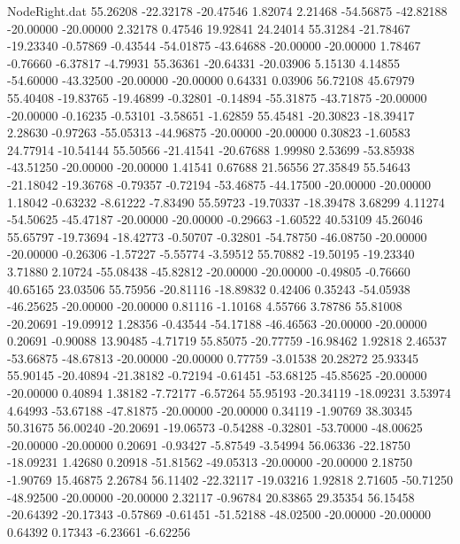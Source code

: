\begin{filecontents}{NodeRight.dat}
  55.26208  -22.32178  -20.47546     1.82074    2.21468  -54.56875  -42.82188  -20.00000  -20.00000    2.32178    0.47546   19.92841   24.24014
  55.31284  -21.78467  -19.23340    -0.57869   -0.43544  -54.01875  -43.64688  -20.00000  -20.00000    1.78467   -0.76660   -6.37817   -4.79931
  55.36361  -20.64331  -20.03906     5.15130    4.14855  -54.60000  -43.32500  -20.00000  -20.00000    0.64331    0.03906   56.72108   45.67979
  55.40408  -19.83765  -19.46899    -0.32801   -0.14894  -55.31875  -43.71875  -20.00000  -20.00000   -0.16235   -0.53101   -3.58651   -1.62859
  55.45481  -20.30823  -18.39417     2.28630   -0.97263  -55.05313  -44.96875  -20.00000  -20.00000    0.30823   -1.60583   24.77914  -10.54144
  55.50566  -21.41541  -20.67688     1.99980    2.53699  -53.85938  -43.51250  -20.00000  -20.00000    1.41541    0.67688   21.56556   27.35849
  55.54643  -21.18042  -19.36768    -0.79357   -0.72194  -53.46875  -44.17500  -20.00000  -20.00000    1.18042   -0.63232   -8.61222   -7.83490
  55.59723  -19.70337  -18.39478     3.68299    4.11274  -54.50625  -45.47187  -20.00000  -20.00000   -0.29663   -1.60522   40.53109   45.26046
  55.65797  -19.73694  -18.42773    -0.50707   -0.32801  -54.78750  -46.08750  -20.00000  -20.00000   -0.26306   -1.57227   -5.55774   -3.59512
  55.70882  -19.50195  -19.23340     3.71880    2.10724  -55.08438  -45.82812  -20.00000  -20.00000   -0.49805   -0.76660   40.65165   23.03506
  55.75956  -20.81116  -18.89832     0.42406    0.35243  -54.05938  -46.25625  -20.00000  -20.00000    0.81116   -1.10168    4.55766    3.78786
  55.81008  -20.20691  -19.09912     1.28356   -0.43544  -54.17188  -46.46563  -20.00000  -20.00000    0.20691   -0.90088   13.90485   -4.71719
  55.85075  -20.77759  -16.98462     1.92818    2.46537  -53.66875  -48.67813  -20.00000  -20.00000    0.77759   -3.01538   20.28272   25.93345
  55.90145  -20.40894  -21.38182    -0.72194   -0.61451  -53.68125  -45.85625  -20.00000  -20.00000    0.40894    1.38182   -7.72177   -6.57264
  55.95193  -20.34119  -18.09231     3.53974    4.64993  -53.67188  -47.81875  -20.00000  -20.00000    0.34119   -1.90769   38.30345   50.31675
  56.00240  -20.20691  -19.06573    -0.54288   -0.32801  -53.70000  -48.00625  -20.00000  -20.00000    0.20691   -0.93427   -5.87549   -3.54994
  56.06336  -22.18750  -18.09231     1.42680    0.20918  -51.81562  -49.05313  -20.00000  -20.00000    2.18750   -1.90769   15.46875    2.26784
  56.11402  -22.32117  -19.03216     1.92818    2.71605  -50.71250  -48.92500  -20.00000  -20.00000    2.32117   -0.96784   20.83865   29.35354
  56.15458  -20.64392  -20.17343    -0.57869   -0.61451  -51.52188  -48.02500  -20.00000  -20.00000    0.64392    0.17343   -6.23661   -6.62256

\end{filecontents}
